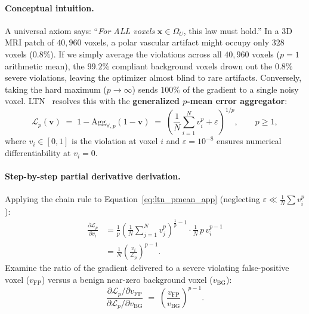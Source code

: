 \documentclass[10pt,a4paper]{article}
\renewcommand{\_}{\origunderscore\allowbreak}
\begin{document}
\paragraph{Conceptual intuition.} A universal axiom says: ``\emph{For ALL voxels} $\mathbf{x} \in \Omega_U$, this law must hold.'' In a 3D MRI patch of $40{,}960$ voxels, a polar vascular artifact might occupy only $328$ voxels ($0.8\%$). If we simply average the violations across all $40{,}960$ voxels ($p=1$ arithmetic mean), the $99.2\%$ compliant background voxels drown out the $0.8\%$ severe violations, leaving the optimizer almost blind to rare artifacts. Conversely, taking the hard maximum ($p \to \infty$) sends $100\%$ of the gradient to a single noisy voxel. LTN~\cite{badreddine2022ltn} resolves this with the \textbf{generalized $p$-mean error aggregator}:
\begin{equation}
    \mathcal{L}_p(\mathbf{v}) \;=\; 1 - \text{Agg}_{\forall, p}(1 - \mathbf{v}) \;=\; \left(\frac{1}{N} \sum_{i=1}^{N} v_i^{p} + \varepsilon\right)^{1/p}, \qquad p \ge 1,
    \label{eq:ltn_pmean_app}
\end{equation}
where $v_i \in [0, 1]$ is the violation at voxel $i$ and $\varepsilon = 10^{-8}$ ensures numerical differentiability at $v_i = 0$.

\paragraph{Step-by-step partial derivative derivation.} Applying the chain rule to Equation~\eqref{eq:ltn_pmean_app} (neglecting $\varepsilon \ll \frac{1}{N}\sum v_i^p$):
\begin{align}
    \frac{\partial \mathcal{L}_p}{\partial v_i}
    &= \frac{1}{p}\left(\frac{1}{N}\sum_{j=1}^{N} v_j^p\right)^{\frac{1}{p} - 1} \cdot \frac{1}{N}\, p\, v_i^{p-1} \nonumber \\
    &= \frac{1}{N}\left(\frac{v_i}{\mathcal{L}_p}\right)^{p-1}.
    \label{eq:pmean_grad_app}
\end{align}
Examine the ratio of the gradient delivered to a severe violating false-positive voxel ($v_{\text{FP}}$) versus a benign near-zero background voxel ($v_{\text{BG}}$):
\begin{equation}
    \frac{\partial \mathcal{L}_p / \partial v_{\text{FP}}}{\partial \mathcal{L}_p / \partial v_{\text{BG}}}
    \;=\; \left(\frac{v_{\text{FP}}}{v_{\text{BG}}}\right)^{p-1}.
    \label{eq:grad_ratio_app}
\end{equation}
\end{document}
